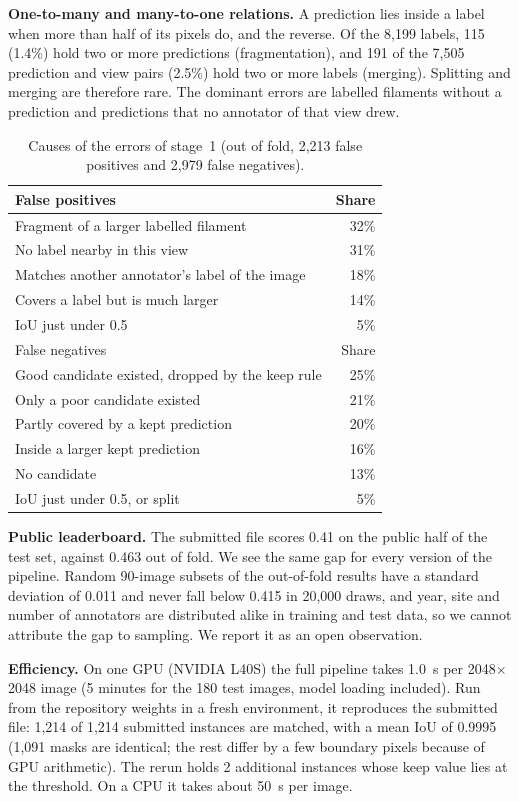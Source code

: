 \documentclass[sigconf]{acmart}
\begin{document}
\textbf{One-to-many and many-to-one relations.} A prediction lies inside a label when more than half of its pixels do, and the reverse. Of the 8,199 labels, 115 (1.4\%) hold two or more predictions (fragmentation), and 191 of the 7,505 prediction and view pairs (2.5\%) hold two or more labels (merging). Splitting and merging are therefore rare. The dominant errors are labelled filaments without a prediction and predictions that no annotator of that view drew.

\begin{table}[t]
  \caption{Causes of the errors of stage~1 (out of fold, 2,213 false positives and 2,979 false negatives).}
  \label{tab:errors}
  \centering\small
  \begin{tabular}{lr}
    \toprule
    False positives & Share \\
    \midrule
    Fragment of a larger labelled filament & 32\% \\
    No label nearby in this view & 31\% \\
    Matches another annotator's label of the image & 18\% \\
    Covers a label but is much larger & 14\% \\
    IoU just under 0.5 & 5\% \\
    \midrule
    False negatives & Share \\
    \midrule
    Good candidate existed, dropped by the keep rule & 25\% \\
    Only a poor candidate existed & 21\% \\
    Partly covered by a kept prediction & 20\% \\
    Inside a larger kept prediction & 16\% \\
    No candidate & 13\% \\
    IoU just under 0.5, or split & 5\% \\
    \bottomrule
  \end{tabular}
\end{table}

\textbf{Public leaderboard.} The submitted file scores 0.41 on the public half of the test set, against 0.463 out of fold. We see the same gap for every version of the pipeline. Random 90-image subsets of the out-of-fold results have a standard deviation of 0.011 and never fall below 0.415 in 20,000 draws, and year, site and number of annotators are distributed alike in training and test data, so we cannot attribute the gap to sampling. We report it as an open observation.

\textbf{Efficiency.} On one GPU (NVIDIA L40S) the full pipeline takes 1.0~s per 2048$\times$2048 image (5 minutes for the 180 test images, model loading included). Run from the repository weights in a fresh environment, it reproduces the submitted file: 1,214 of 1,214 submitted instances are matched, with a mean IoU of 0.9995 (1,091 masks are identical; the rest differ by a few boundary pixels because of GPU arithmetic). The rerun holds 2 additional instances whose keep value lies at the threshold. On a CPU it takes about 50~s per image.
\end{document}
